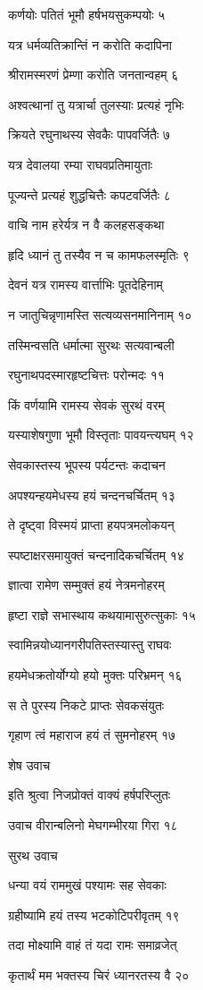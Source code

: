 कर्णयोः पतितं भूमौ हर्षभयसुकम्पयोः ५

यत्र धर्मव्यतिक्रान्तिं न करोति कदापिना

श्रीरामस्मरणं प्रेम्णा करोति जनतान्वहम् ६

अश्वत्थानां तु यत्रार्चा तुलस्याः प्रत्यहं नृभिः

क्रियते रघुनाथस्य सेवकैः पापवर्जितैः ७

यत्र देवालया रम्या राघवप्रतिमायुताः

पूज्यन्ते प्रत्यहं शुद्धचित्तैः कपटवर्जितैः ८

वाचि नाम हरेर्यत्र न वै कलहसङ्कथा

हृदि ध्यानं तु तस्यैव न च कामफलस्मृतिः ९

देवनं यत्र रामस्य वार्त्ताभिः पूतदेहिनाम्

न जातुचिन्नृणामस्ति सत्यव्यसनमानिनाम् १०

तस्मिन्वसति धर्मात्मा सुरथः सत्यवान्बली

रघुनाथपदस्मारहृष्टचित्तः परोन्मदः ११

किं वर्णयामि रामस्य सेवकं सुरथं वरम्

यस्याशेषगुणा भूमौ विस्तृताः पावयन्त्यघम् १२

सेवकास्तस्य भूपस्य पर्यटन्तः कदाचन

अपश्यन्हयमेधस्य हयं चन्दनचर्चितम् १३

ते दृष्ट्वा विस्मयं प्राप्ता हयपत्रमलोकयन्

स्पष्टाक्षरसमायुक्तं चन्दनादिकचर्चितम् १४

ज्ञात्वा रामेण सम्मुक्तं हयं नेत्रमनोहरम्

हृष्टा राज्ञे सभास्थाय कथयामासुरुत्सुकाः १५

स्वामिन्नयोध्यानगरीपतिस्तस्यास्तु राघवः

हयमेधक्रतोर्योग्यो हयो मुक्तः परिभ्रमन् १६

स ते पुरस्य निकटे प्राप्तः सेवकसंयुतः

गृहाण त्वं महाराज हयं तं सुमनोहरम् १७

शेष उवाच

इति श्रुत्वा निजप्रोक्तं वाक्यं हर्षपरिप्लुतः

उवाच वीरान्बलिनो मेघगम्भीरया गिरा १८

सुरथ उवाच

धन्या वयं राममुखं पश्यामः सह सेवकाः

ग्रहीष्यामि हयं तस्य भटकोटिपरीवृतम् १९

तदा मोक्ष्यामि वाहं तं यदा रामः समाव्रजेत्

कृतार्थं मम भक्तस्य चिरं ध्यानरतस्य वै २०

